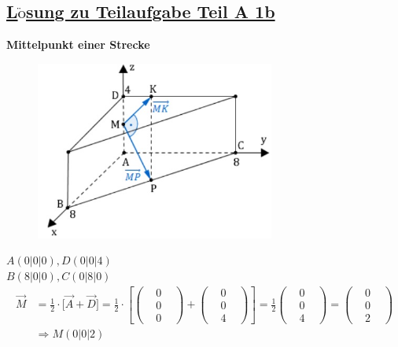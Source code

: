 \documentclass[a4 paper, 12pt]{report}
\theoremstyle{plain}
\begin{document}
\subsection*{\underline{L$\ddot{\mbox{o}}$sung zu Teilaufgabe Teil A 1b}}
\textbf{Mittelpunkt einer Strecke}
\begin{figure}[h]
	\centering
		\includegraphics[width=0.70\textwidth]{image3.jpg}
	\label{fig:image3}
\end{figure}
\newpage
$A(0|0|0), D(0|0|4)$\\
$B(8|0|0), C(0|8|0)$
\begin{align*}
\stackrel{\longrightarrow}{M}& = \frac{1}{2}\cdot \bigg[\stackrel{\longrightarrow}{A}+\stackrel{\longrightarrow}{D}\bigg] = \frac{1}{2}\cdot\left[
\begin{pmatrix}
&0&\\&0&\\&0&
\end{pmatrix}
+
\begin{pmatrix}
&0&\\&0&\\&4&
\end{pmatrix}
\right]
 = \frac{1}{2}
\begin{pmatrix}
&0&\\&0&\\&4&
\end{pmatrix}
= 
\begin{pmatrix}
&0&\\&0&\\&2&
\end{pmatrix}\\
&\Longrightarrow M(0|0|2)
\end{align*}
\end{document}
